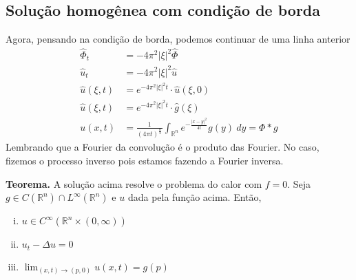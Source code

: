 \documentclass[11pt]{article}
\newcommand{\Rn}{{\mathbb{R}^n}}
\newcommand{\parentesis}[1]{\left(#1\right)}
\begin{document}
\subsection*{Solução homogênea com condição de borda}
Agora, pensando na condição de borda, podemos continuar de uma linha anterior \begin{align*}
	\hat{\Phi}_t &= - 4\pi^2 |\xi|^2 \hat{\Phi} \\
	\hat{u}_t &= - 4\pi^2 |\xi|^2 \hat{u} \\
	\hat{u}(\xi,t) &= e^{-4\pi^2|\xi|^2 t} \cdot \hat{u}(\xi,0) \\
	\hat{u}(\xi,t) &= e^{-4\pi^2|\xi|^2 t} \cdot \hat{g}(\xi) \\
	u(x,t) &= \frac{1}{\parentesis{4\pi t}^\frac{n}{2}} \int_\Rn e^{-\frac{|x-y|^2}{4t}} g(y)\ dy  = \Phi * g
\end{align*}
Lembrando que a Fourier da convolução é o produto das Fourier. No caso, fizemos o processo inverso pois estamos fazendo a Fourier inversa.

\textbf{Teorema.} A solução acima resolve o problema do calor com \(f=0\).
Seja \(g \in C(\Rn) \cap L^\infty(\Rn)\) e \(u\) dada pela função acima. Então,\begin{enumerate}[(i)]
	\item \(u \in C^\infty(\Rn \times (0,\infty))\)
	\item \(u_t - \Delta u = 0\)
	\item \(\lim_{(x,t)\rightarrow(p,0)} u(x,t) = g(p)\)
\end{enumerate}
\end{document}

